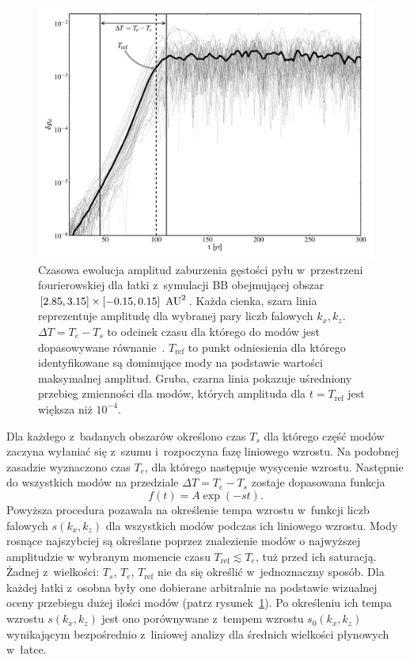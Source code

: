 \begin{figure}
  \includegraphics[width=0.98\linewidth]{figures/fig7}

  \caption{Czasowa ewolucja amplitud zaburzenia gęstości pyłu w~przestrzeni
     fourierowskiej dla łatki z~symulacji BB obejmującej obszar 
     $[2.85,3.15]\times[-0.15,0.15]~\hbox{$\thinspace\textrm{AU}$}^2$. Każda cienka, szara linia
     reprezentuje amplitudę dla wybranej pary liczb falowych $k_x, k_z$.
     $\Delta T = T_e - T_s$ to odcinek czasu dla którego do modów jest
     dopasowywane równanie~. $T_{\textrm{ref}}$ to punkt
     odniesienia dla którego identyfikowane są dominujące mody na podstawie
     wartości maksymalnej amplitud. Gruba, czarna linia pokazuje uśredniony
     przebieg zmienności dla modów, których amplituda dla $t = T_{\textrm{ref}}$
     jest większa niż $10^{-4}$.} 
   \label{fig7} 
\end{figure}

Dla każdego z~badanych obszarów określono czas $T_s$ dla którego część modów
zaczyna wyłaniać się z~szumu i~rozpoczyna fazę liniowego wzrostu. Na
podobnej zasadzie wyznaczono czas $T_e$, dla którego następuje wysycenie
wzrostu. Następnie do wszystkich modów na przedziale $\Delta T = T_e - T_s$
zostaje dopasowana funkcja
%
\begin{equation}
   f(t) = A\exp\left(-s t\right).
   \label{eq:fit}
\end{equation}
%
Powyższa procedura pozawala na określenie tempa wzrostu w~funkcji liczb falowych
$s(k_x, k_z)$ dla wszystkich modów podczas ich liniowego wzrostu. Mody rosnące
najszybciej są określane poprzez znalezienie modów o najwyższej amplitudzie w
wybranym momencie czasu $T_{\textrm{ref}} \lesssim T_e$, tuż przed ich
saturacją. Żadnej z~wielkości: $T_s$, $T_e$, $T_{\textrm{ref}}$ nie da się
określić w~jednoznaczny sposób. Dla każdej łatki z~osobna były one dobierane
arbitralnie na podstawie wizualnej oceny przebiegu dużej ilości modów (patrz
rysunek~\ref{fig7}).  Po określeniu ich tempa wzrostu $s(k_x, k_z)$ jest ono
porównywane z~tempem wzrostu $s_0(k_x, k_z)$ wynikającym bezpośrednio z~liniowej
analizy dla średnich wielkości płynowych w~łatce.

